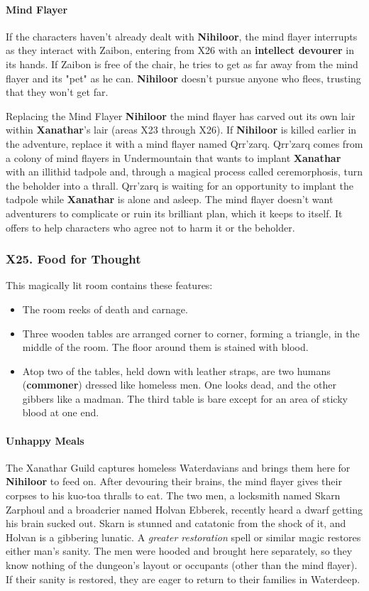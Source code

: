 \documentclass[10pt,a4paper,twoside,twocolumn,openany,nodeprecatedcode]{dndbook}
\begin{document}
\paragraph{Mind Flayer}
If the characters haven't already dealt with \textbf{Nihiloor}, the mind flayer interrupts as they interact with Zaibon, entering from X26 with an \textbf{intellect devourer} in its hands. If Zaibon is free of the chair, he tries to get as far away from the mind flayer and its "pet" as he can. \textbf{Nihiloor} doesn't pursue anyone who flees, trusting that they won't get far.
\begin{DndComment}{Replacing the Mind Flayer}
\textbf{Nihiloor} the mind flayer has carved out its own lair within \textbf{Xanathar}'s lair (areas X23 through X26). If \textbf{Nihiloor} is killed earlier in the adventure, replace it with a mind flayer named Qrr'zarq.
Qrr'zarq comes from a colony of mind flayers in Undermountain that wants to implant \textbf{Xanathar} with an illithid tadpole and, through a magical process called ceremorphosis, turn the beholder into a thrall. Qrr'zarq is waiting for an opportunity to implant the tadpole while \textbf{Xanathar} is alone and asleep. The mind flayer doesn't want adventurers to complicate or ruin its brilliant plan, which it keeps to itself. It offers to help characters who agree not to harm it or the beholder.
\end{DndComment}

\subsubsection{X25. Food for Thought}
This magically lit room contains these features:
\begin{itemize}

\item The room reeks of death and carnage.
\item Three wooden tables are arranged corner to corner, forming a triangle, in the middle of the room. The floor around them is stained with blood.
\item Atop two of the tables, held down with leather straps, are two humans (\textbf{commoner}) dressed like homeless men. One looks dead, and the other gibbers like a madman. The third table is bare except for an area of sticky blood at one end.
\end{itemize}


\paragraph{Unhappy Meals}
The Xanathar Guild captures homeless Waterdavians and brings them here for \textbf{Nihiloor} to feed on. After devouring their brains, the mind flayer gives their corpses to his kuo-toa thralls to eat.
The two men, a locksmith named Skarn Zarphoul and a broadcrier named Holvan Ebberek, recently heard a dwarf getting his brain sucked out. Skarn is stunned and catatonic from the shock of it, and Holvan is a gibbering lunatic. A \textit{greater restoration} spell or similar magic restores either man's sanity. The men were hooded and brought here separately, so they know nothing of the dungeon's layout or occupants (other than the mind flayer). If their sanity is restored, they are eager to return to their families in Waterdeep.
\end{document}
